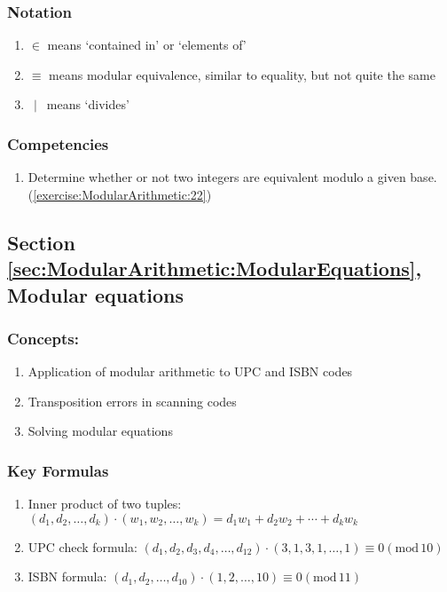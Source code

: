 \subsubsection*{Notation}
\begin{enumerate}
\item
$\in$  means `contained in' or `elements of'
\item 
$\equiv$  means modular equivalence, similar to equality, but not quite the same
\item 
$\,\mid\,$  means `divides'
\end{enumerate}


\subsubsection*{Competencies}
\begin{enumerate}
\item
Determine whether or not two integers are equivalent modulo a given base. (\ref{exercise:ModularArithmetic:22}) 
\end{enumerate}


\subsection*{Section \ref{sec:ModularArithmetic:ModularEquations}, Modular equations}
\subsubsection*{Concepts:}
\begin{enumerate}
\item 
Application of modular arithmetic to UPC and ISBN codes
\item 
Transposition errors in scanning codes
\item
Solving modular equations
\end{enumerate}

\subsubsection*{Key Formulas}
\begin{enumerate}
\item
Inner product of two tuples: $(d_{1}, d_{2}, \dots, d_{k}) \cdot (w_{1}, w_{2}, \dots, w_{k}) = d_{1} w_{1} + d_{2}w_{2} + \cdots + d_{k}w_{k}$
\item    
UPC check formula: $(d_{1}, d_{2}, d_{3}, d_{4}, \dots, d_{12}) \cdot (3, 1, 3, 1, \dots, 1) \equiv 0 (\text{mod}\, 10)$
\item 
ISBN formula: $(d_{1}, d_{2}, \dots, d_{10}) \cdot (1, 2, \dots, 10) \equiv 0(\text{mod}\, 11)$


\end{enumerate}

